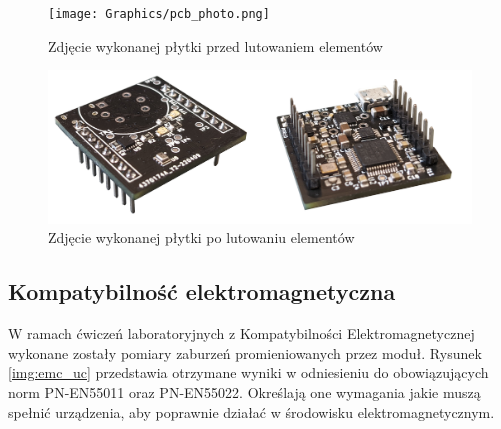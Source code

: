 \begin{figure}
    \centering
    \texttt{[image: Graphics/pcb\_photo.png]}
    \caption{Zdjęcie wykonanej płytki przed lutowaniem elementów}
    \label{img:pcb_photo}
\end{figure}

\begin{figure}
    \centering
    \includegraphics[width=\textwidth, height=\textheight, keepaspectratio]{Graphics/pcb_rdy_photo.png}
    \caption{Zdjęcie wykonanej płytki po lutowaniu elementów}
    \label{img:pcb_rdy_photo}
\end{figure}

\subsection{Kompatybilność elektromagnetyczna}
W ramach ćwiczeń laboratoryjnych z Kompatybilności Elektromagnetycznej wykonane zostały pomiary zaburzeń promieniowanych przez moduł. 
Rysunek \ref{img:emc_uc} przedstawia otrzymane wyniki w odniesieniu do obowiązujących norm PN-EN55011 oraz PN-EN55022. Określają one
wymagania jakie muszą spełnić urządzenia, aby poprawnie działać w środowisku elektromagnetycznym.

